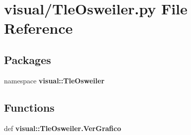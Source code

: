 \section{visual/\-Tle\-Osweiler.py \-File \-Reference}
\label{_tle_osweiler_8py}
\subsection*{\-Packages}
\begin{DoxyCompactItemize}
\item 
namespace {\bf visual\-::\-Tle\-Osweiler}
\end{DoxyCompactItemize}
\subsection*{\-Functions}
\begin{DoxyCompactItemize}
\item 
def {\bf visual\-::\-Tle\-Osweiler.\-Ver\-Grafico}
\end{DoxyCompactItemize}
